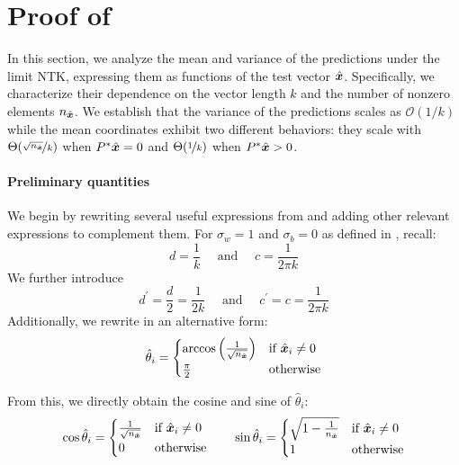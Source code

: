 %
\section{Proof of }
\label{app:proof_orders}
In this section, we analyze the mean and variance of the predictions under the limit NTK, expressing them as functions of the test vector $\hat{\boldsymbol{x}}$. Specifically, we characterize their dependence on the vector length $k$ and the number of nonzero elements $n_{\hat{\boldsymbol{x}}}$.
We establish that the variance of the predictions scales as $\mathcal{O}\left(1/k\right)$ while the mean coordinates exhibit two different behaviors: they scale with $\Theta(\nicefrac{\sqrt{n_{\hat{\boldsymbol{x}}}}}{k})$ when $P^*\hat{\boldsymbol{x}}=0$ and $\Theta(\nicefrac{1}{k})$ when $P^*\hat{\boldsymbol{x}}>0$.
\paragraph{Preliminary quantities}
We begin by rewriting several useful expressions from  and adding other relevant expressions to complement them. For $\sigma_w = 1$ and $\sigma_b=0$ as defined in , recall:
\begin{equation*}
    d=\frac{1}{k}\quad \textrm{ and } \quad c=\frac{1}{2\pi k}
\end{equation*}
We further introduce 
\begin{equation*}
    d^\prime = \frac{d}{2} = \frac{1}{2k} \quad \textrm{ and }\quad c^\prime = c= \frac{1}{2\pi k}
\end{equation*}
Additionally, we rewrite  in an alternative form:
\begin{equation*}
        \hat{\theta}_i = \begin{cases}
        \arccos\left(\frac{1}{\sqrt{n_{\hat{\boldsymbol{x}}}}}\right) &\textrm{if } \hat{\boldsymbol{x}}_i \neq 0\\
        \frac{\pi}{2} &\textrm{otherwise}
    \end{cases}
\end{equation*}

From this, we directly obtain the cosine and sine of $\hat{\theta}_i$:
\begin{equation*}
    \cos\hat{\theta}_i = \begin{cases}
        \frac{1}{\sqrt{n_{\hat{\boldsymbol{x}}}}} &\textrm{if } \hat{\boldsymbol{x}}_i \neq 0\\
        0 &\textrm{otherwise}
    \end{cases}
    \qquad 
    \sin\hat{\theta}_i = \begin{cases}
        \sqrt{1-\frac{1}{n_{\hat{\boldsymbol{x}}}}} &\textrm{if } \hat{\boldsymbol{x}}_i \neq 0\\
        1 &\textrm{otherwise}
    \end{cases}
\end{equation*}

